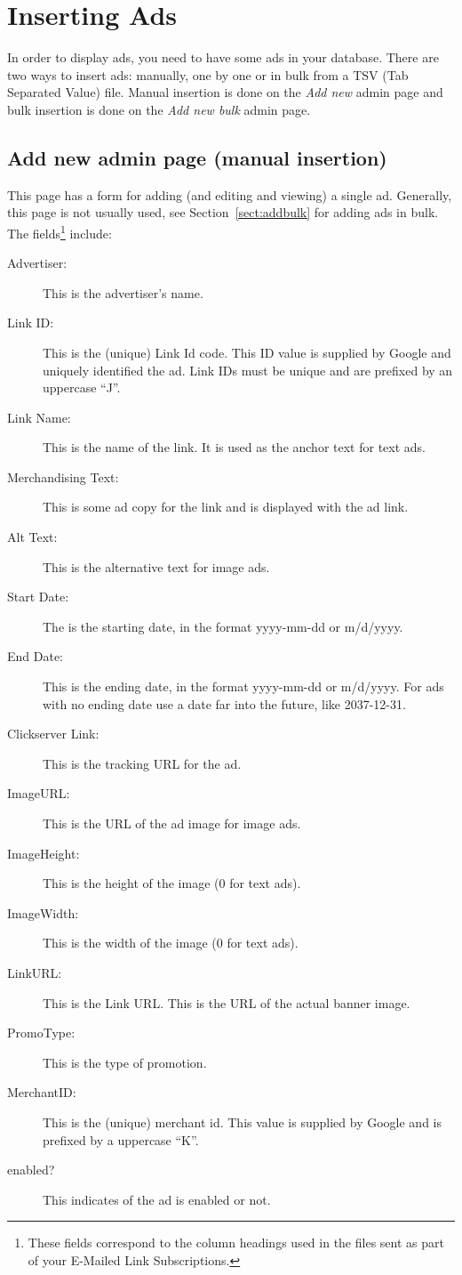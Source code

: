 \documentclass[letterpaper]{article}
\begin{document}
\section{Inserting Ads}

In order to display ads, you need to have some ads in your database.
There are two ways to insert ads: manually, one by one or in bulk from
a TSV (Tab Separated Value) file. Manual insertion is done on the
\emph{Add new} admin page and bulk insertion is done on the
\emph{Add new bulk} admin page.

\subsection{Add new admin page (manual insertion)}

This page has a form for adding (and editing and viewing) a single ad.
Generally, this page is not usually used, see
Section~\ref{sect:addbulk} for adding ads in bulk. The
fields\footnote{These fields correspond to the column headings used in
the files sent as part of your E-Mailed Link Subscriptions.} include: 

\begin{description}
  \item[Advertiser:] This is the advertiser's name.
  \item[Link ID:] This is the (unique) Link Id code. This ID value is
supplied by Google and uniquely identified the ad.  Link IDs must be
unique and are prefixed by an uppercase ``J''.
  \item[Link Name:] This is the name of the link.  It is used as the
anchor text for text ads.
  \item[Merchandising Text:] This is some ad copy for the
link and is displayed with the ad link.
  \item[Alt Text:] This is the alternative text for image
ads.
  \item[Start Date:] The is the starting date, in the format yyyy-mm-dd
or m/d/yyyy. 
  \item[End Date:] This is the ending date, in the format yyyy-mm-dd or
m/d/yyyy. For ads with no ending date use a date far into the future,
like 2037-12-31.
  \item[Clickserver Link:] This is the tracking URL for the ad. 
  \item[ImageURL:] This is the URL of the ad image for image ads. 
  \item[ImageHeight:] This is the height of the image (0 for text ads). 
  \item[ImageWidth:] This is the width of the image (0 for text ads). 
  \item[LinkURL:] This is the Link URL.  This is the URL of the actual
banner image.
  \item[PromoType:] This is the type of promotion.
  \item[MerchantID:] This is the (unique) merchant id.  This value is
supplied by Google and is prefixed by a uppercase ``K''.
  \item[enabled?] This indicates of the ad is enabled or
not. 
\end{description}
\end{document}
